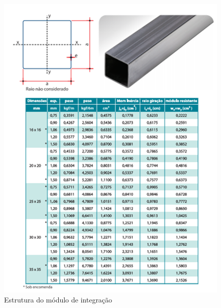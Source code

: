 \begin{anexosenv}
\begin{figure}[!ht]
	\centering
		\includegraphics[scale=0.6]{figuras/estrutura/anexos/18.png}
	\caption{Estrutura do módulo de integração}
\end{figure}


\end{anexosenv}
